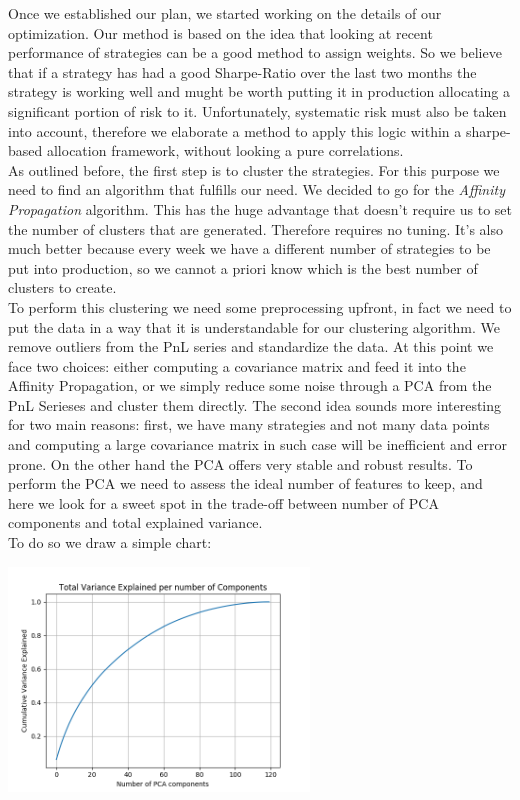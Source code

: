 Once we established our plan, we started working on the details of our optimization. Our method is based on the idea that looking at recent performance of strategies can be a good method to assign weights. So we believe that if a strategy has had a good Sharpe-Ratio over the last two months the strategy is working well and mught be worth putting it in production allocating a significant portion of risk to it. Unfortunately, systematic risk must also be taken into account, therefore we elaborate a method to apply this logic within a sharpe-based allocation framework, without looking a pure correlations.\\
As outlined before, the first step is to cluster the strategies. For this purpose we need to find an algorithm that fulfills our need. We decided to go for the \textit{Affinity Propagation} algorithm. This has the huge advantage that doesn't require us to set the number of clusters that are generated. Therefore requires no tuning. It's also much better because every week we have a different number of strategies to be put into production, so we cannot a priori know which is the best number of clusters to create.\\
To perform this clustering we need some preprocessing upfront, in fact we need to put the data in a way that it is understandable for our clustering algorithm. We remove outliers from the PnL series and standardize the data. At this point we face two choices: either computing a covariance matrix and feed it into the Affinity Propagation, or we simply reduce some noise through a PCA from the PnL Serieses and cluster them directly. The second idea sounds more interesting for two main reasons: first, we have many strategies and not many data points and computing a large covariance matrix in such case will be inefficient and error prone. On the other hand the PCA offers very stable and robust results. To perform the PCA we need to assess the ideal number of features to keep, and here we look for a sweet spot in the trade-off between number of PCA components and total explained variance.\\
To do so we draw a simple chart:

\begin{center}
	\centering
	\includegraphics[width=0.6\textwidth]{HRP/PCA_Components.png}
	\label{CRP_PCA}
\end{center}

